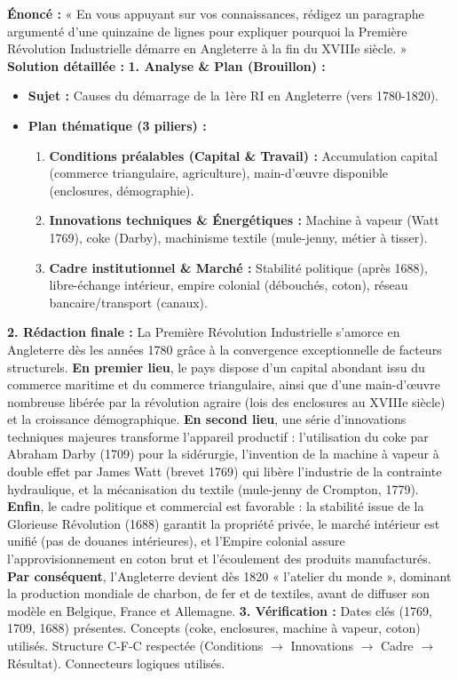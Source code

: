 \documentclass[11pt]{article}
\newcommand{\cle}[1]{{\popxbold\color{popdark}#1}}
\begin{document}
\begin{exoresolu}
\textbf{Énoncé :} « En vous appuyant sur vos connaissances, rédigez un paragraphe argumenté d'une quinzaine de lignes pour expliquer pourquoi la Première Révolution Industrielle démarre en Angleterre à la fin du XVIIIe siècle. »
\tcblower
\textbf{Solution détaillée :}
\textbf{1. Analyse \& Plan (Brouillon) :}
\begin{itemize}
    \item \textbf{Sujet :} Causes du démarrage de la 1ère RI en Angleterre (vers 1780-1820).
    \item \textbf{Plan thématique (3 piliers) :}
    \begin{enumerate}
        \item \textbf{Conditions préalables (Capital \& Travail) :} Accumulation capital (commerce triangulaire, agriculture), main-d'œuvre disponible (enclosures, démographie).
        \item \textbf{Innovations techniques \& Énergétiques :} Machine à vapeur (Watt 1769), coke (Darby), machinisme textile (mule-jenny, métier à tisser).
        \item \textbf{Cadre institutionnel \& Marché :} Stabilité politique (après 1688), libre-échange intérieur, empire colonial (débouchés, coton), réseau bancaire/transport (canaux).
    \end{enumerate}
\end{itemize}
\textbf{2. Rédaction finale :}
La Première Révolution Industrielle s'amorce en Angleterre dès les années 1780 grâce à la convergence exceptionnelle de facteurs structurels. \textbf{En premier lieu}, le pays dispose d'un capital abondant issu du commerce maritime et du commerce triangulaire, ainsi que d'une main-d'œuvre nombreuse libérée par la révolution agraire (lois des \cle{enclosures} au XVIIIe siècle) et la croissance démographique. \textbf{En second lieu}, une série d'innovations techniques majeures transforme l'appareil productif : l'utilisation du \cle{coke} par Abraham Darby (1709) pour la sidérurgie, l'invention de la \cle{machine à vapeur} à double effet par James \cle{Watt} (brevet 1769) qui libère l'industrie de la contrainte hydraulique, et la mécanisation du textile (mule-jenny de Crompton, 1779). \textbf{Enfin}, le cadre politique et commercial est favorable : la stabilité issue de la \cle{Glorieuse Révolution} (1688) garantit la propriété privée, le marché intérieur est unifié (pas de douanes intérieures), et l'Empire colonial assure l'approvisionnement en \cle{coton} brut et l'écoulement des produits manufacturés. \textbf{Par conséquent}, l'Angleterre devient dès 1820 « l'atelier du monde », dominant la production mondiale de charbon, de fer et de textiles, avant de diffuser son modèle en Belgique, France et Allemagne.
\textbf{3. Vérification :} Dates clés (1769, 1709, 1688) présentes. Concepts (\cle{coke}, \cle{enclosures}, \cle{machine à vapeur}, \cle{coton}) utilisés. Structure C-F-C respectée (Conditions $\rightarrow$ Innovations $\rightarrow$ Cadre $\rightarrow$ Résultat). Connecteurs logiques utilisés.
\end{exoresolu}
\end{document}
